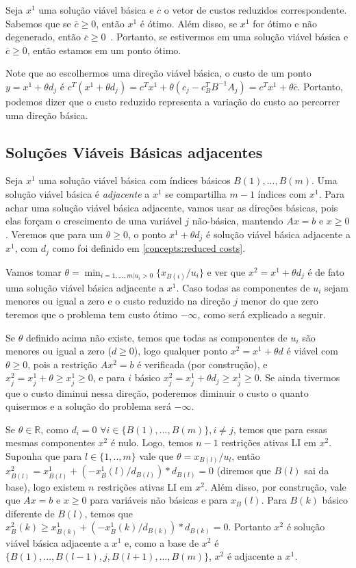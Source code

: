 \documentclass[12pt]{article}
\begin{document}
    Seja $x^1$ uma solução viável básica e $\overline{c}$ o vetor de custos reduzidos correspondente. Sabemos que se $\overline{c} \geq 0$, então $x^1$ é ótimo. Além disso, se $x^1$ for ótimo e não degenerado, então $\overline{c} \geq 0$~\cite{315book}. Portanto, se estivermos em uma solução viável básica e $\overline{c} \geq 0$, então estamos em um ponto ótimo.
    
    Note que ao escolhermos uma direção viável básica, o custo de um ponto $y = x^1 + \theta d_j$ é $c^{T}(x^1 + \theta d_j) = c^{T}x^1 + \theta (c_j - c^{T}_{B}B^{-1}A_j) = c^{T}x^1 + \theta \overline{c}$. Portanto, podemos dizer que o custo reduzido representa a variação do custo ao percorrer uma direção básica.

\subsection{Soluções Viáveis Básicas adjacentes}\label{concepts:adj_svb}
	Seja $x^1$ uma solução viável básica com índices básicos $B(1), ..., B(m)$. Uma solução viável básica é \emph{adjacente} a $x^1$ se compartilha $m-1$ índices com $x^1$. Para achar uma solução viável básica adjacente, vamos usar as direções básicas, pois elas forçam o crescimento de uma variável $j$ não-básica, mantendo $Ax = b$ e $x \geq 0$. Veremos que para um $\theta \geq 0$, o ponto $x^1 + \theta d_j$ é solução viável básica adjacente a $x^1$, com $d_j$ como foi definido em \ref{concepts:reduced costs}. 
    
    Vamos tomar $\theta = \min_{i = 1,...,m | u_i > 0}{\{x_{B(i)} / u_i\}}$ e ver que $x^2 = x^1 + \theta d_j$ é de fato uma solução viável básica adjacente a $x^1$. Caso todas as componentes de $u_i$ sejam menores ou igual a zero e o custo reduzido na direção $j$ menor do que zero teremos que o problema tem custo ótimo $- \infty$, como será explicado a seguir.
    
    Se $\theta$ definido acima não existe, temos que todas as componentes de $u_i$ são menores ou igual a zero ($d \geq 0$), logo qualquer ponto $x^2 = x^1 + \theta d$ é viável com $\theta \geq 0$, pois a restrição $Ax^2 = b$ é verificada (por construção), e $x^2_j = x^1_j + \theta \geq x^1_j \geq 0$, e para $i$ básico $x^2_j = x^1_j + \theta d_ j \geq x^1_j \geq 0$. Se ainda tivermos que o custo diminui nessa direção, poderemos diminuir o custo o quanto quisermos e a solução do problema será $- \infty$.
    
    Se $\theta \in \mathbb{R}$, como $d_i = 0$ $\forall{i \in \{B(1), ..., B(m)\}, i \neq j}$, temos que para essas mesmas componentes $x^2$ é nulo. Logo, temos $n - 1$ restrições ativas LI em $x^2$. Suponha que para $l \in \{1,..,m\}$ vale que $\theta =  x_{B(l)} / u_l$, então $x^2_{B(l)} = x^1_{B(l)} + (-x^1_B(l)/d_{B(l)}) * d_{B(l)} = 0$ (diremos que $B(l)$ sai da base), logo existem $n$ restrições ativas LI em $x^2$. Além disso, por construção, vale que $Ax = b$ e $x \geq 0$ para variáveis não básicas e para $x_B(l)$. Para $B(k)$ básico diferente de $B(l)$, temos que $x^2_B(k) \geq x^1_{B(k)} + (-x^1_B(k)/d_{B(k)}) * d_{B(k)} = 0$. Portanto $x^2$ é solução viável básica adjacente a $x^1$ e, como a base de $x^2$ é $\{B(1), ..., B(l - 1), j, B(l + 1), ..., B(m)\}$, $x^2$ é adjacente a $x^1$.
    
\end{document}
